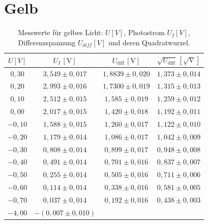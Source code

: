 \section{Gelb}
\begin{table}[h!]
    \centering
    \begin{tabular}{cccc}
    \hline
    $U [V]$ & $U_I \, [\mathrm{V}]$ & $U_{\text{diff}} \, [\mathrm{V}]$ & $\sqrt{U_{\text{diff}}} \, [\mathrm{\sqrt{V}}]$ \\
    \hline
    $0,30$ & $3,549 \pm 0,017$ & $1,8839 \pm 0,020$ & $1,373 \pm 0,014$ \\
    $0,20$ & $2,993 \pm 0,016$ & $1,7300 \pm 0,019$ & $1,315 \pm 0,013$ \\
    $0,10$ & $2,512 \pm 0,015$ & $1,585 \pm 0,019$ & $1,259 \pm 0,012$ \\
    $0,00$ & $2,017 \pm 0,015$ & $1,420 \pm 0,018$ & $1,192 \pm 0,011$ \\
    $-0,10$ & $1,588 \pm 0,015$ & $1,260 \pm 0,017$ & $1,122 \pm 0,010$ \\
    $-0,20$ & $1,179 \pm 0,014$ & $1,086 \pm 0,017$ & $1,042 \pm 0,009$ \\
    $-0,30$ & $0,808 \pm 0,014$ & $0,899 \pm 0,017$ & $0,948 \pm 0,008$ \\
    $-0,40$ & $0,491 \pm 0,014$ & $0,701 \pm 0,016$ & $0,837 \pm 0,007$ \\
    $-0,50$ & $0,255 \pm 0,014$ & $0,505 \pm 0,016$ & $0,711 \pm 0,006$ \\
    $-0,60$ & $0,114 \pm 0,014$ & $0,338 \pm 0,016$ & $0,581 \pm 0,005$ \\
    $-0,70$ & $0,037 \pm 0,014$ & $0,192 \pm 0,016$ & $0,438 \pm 0,003$ \\
    $-4,00$ & $-(0,007 \pm 0,010)$ & & \\
    \hline
    \end{tabular}
    \caption{Messwerte für gelbes Licht: $U [V]$, Photostrom $U_I [V]$, Differenzspannung $U_{diff} [V]$ und deren Quadratwurzel.}
    \label{tab:gelb_values}
\end{table}

\newpage

